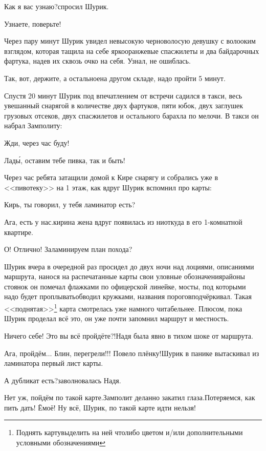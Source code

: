\diagdash Как я вас узнаю?\mdash спросил Шурик.

\diagdash Узнаете, поверьте!

Через пару минут Шурик увидел невысокую черноволосую девушку с волооким взглядом, которая тащила на себе ярко\sdash оранжевые спасжилеты и два байдарочных фартука, надев их сквозь очко на себя. Узнал, не ошиблась.

\diagdash Так, вот, держите, а остальное\mdash на другом складе, надо пройти 5 минут.

Спустя 20 минут Шурик под впечатлением от встречи садился в такси, весь увешанный снарягой в количестве двух фартуков, пяти юбок, двух заглушек грузовых отсеков, двух спасжилетов и остального барахла по мелочи. В такси он набрал Замполиту:

\diagdash Жди, через час буду!

\diagdash Лад\'{ы}, оставим тебе пивка, так и быть!

Через час ребята затащили домой к Кире снарягу и собрались уже в <<пивотеку>> на 1 этаж, как вдруг Шурик вспомнил про карты:

\diagdash Кирь, ты говорил, у тебя ламинатор есть?

\diagdash Ага, есть у нас.\mdash кирина жена вдруг появилась из ниоткуда в его 1-комнатной квартире.

\diagdash О! Отлично! Заламинируем план похода?

Шурик вчера в очередной раз просидел до двух ночи над лоциями, описаниями маршрута, нанося на распечатанные карты свои уловные обозначения\mdash районы стоянок он помечал флажками по офицерской линейке, мосты, под которыми надо будет проплывать\mdash обводил кружками, названия порогов\mdash подчёркивал. Такая <<поднятая>>\footnote{Поднять карту\mdash выделить на ней что\sdash либо цветом и/или дополнительными условными обозначениями} карта смотрелась уже намного читабельнее. Плюсом, пока Шурик проделал всё это, он уже почти запомнил маршрут и местность.

\diagdash Ничего себе! Это вы всё пройдёте?!\mdash Надя была явно в тихом шоке от маршрута.

\diagdash Ага, пройдём$\ldots$ Блин, перегрели!!! Повело плёнку!\mdash Шурик в панике вытаскивал из ламинатора первый лист карты.

\diagdash А дубликат есть?\mdash заволновалась Надя.

\diagdash Нет уж, пойдём по такой карте.\mdash Замполит деланно закатил глаза.\mdash Потеряемся, как пить дать! Ё\sdash моё! Ну всё, Шурик, по такой карте идти нельзя! 

